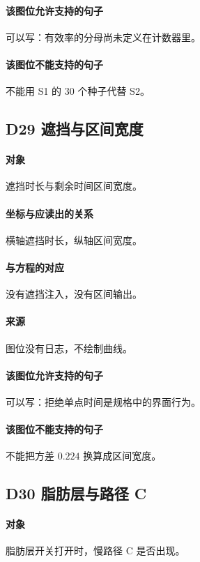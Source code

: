 \paragraph{该图位允许支持的句子}
可以写：有效率的分母尚未定义在计数器里。

\paragraph{该图位不能支持的句子}
不能用 S1 的 30 个种子代替 S2。

\subsection{D29 遮挡与区间宽度}
\paragraph{对象}
遮挡时长与剩余时间区间宽度。

\paragraph{坐标与应读出的关系}
横轴遮挡时长，纵轴区间宽度。

\paragraph{与方程的对应}
没有遮挡注入，没有区间输出。

\paragraph{来源}
图位没有日志，不绘制曲线。

\paragraph{该图位允许支持的句子}
可以写：拒绝单点时间是规格中的界面行为。

\paragraph{该图位不能支持的句子}
不能把方差 $0.224$ 换算成区间宽度。

\subsection{D30 脂肪层与路径 C}
\paragraph{对象}
脂肪层开关打开时，慢路径 C 是否出现。

